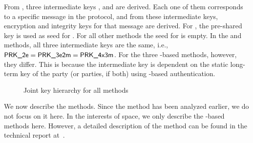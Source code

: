 From \mGxy{}, three intermediate keys \mPRKtwo, \mPRKthree{} and
\mPRKthree{} are derived.
%
Each one of them corresponds to a specific message in the protocol, and from
these intermediate keys, encryption and integrity keys for that message are
derived.
%
For \mPskPsk{}, the pre-shared key is used as seed for \mPRKtwo.
%
For all other methods the seed for \mPRKtwo{} is empty.
%
In the \mPskPsk{} and \mSigSig{} methods, all three intermediate keys
are the same, i.e., $\textsf{PRK\_2e}{} = \textsf{PRK\_3e2m}{} = \textsf{PRK\_4x3m}$.
%
For the three \mStat-based methods, however, they differ.
%
This is because the intermediate key \mPRKthree{} is dependent on the static
long-term key of the party (or parties, if both) using \mStat{}-based
authentication.
%

\begin{figure}[!h]
\scalebox{.75}{

}
\caption{Joint key hierarchy for all methods}
\label{fig:kdfdiagram}
\end{figure}


We now describe the \mEdhoc{} methods. Since the \mSigSig{} method has been analyzed earlier, we do not focus on it here. In the interests of space, we only describe the \mStat-based methods here. However, a detailed description of the \mPskPsk{} method can be found in the technical report at~\cite{edhocTamarinRepo}. 
%

